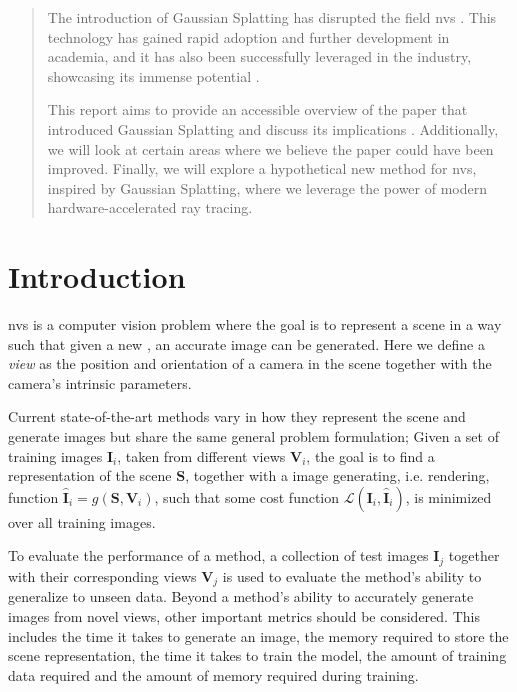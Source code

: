 \begin{abstract}
    The introduction of Gaussian Splatting has disrupted the field \gls{nvs} \cite{kerbl3DGaussianSplatting2023}. This technology has gained rapid adoption and further development in academia, and it has also been successfully leveraged in the industry, showcasing its immense potential \cite{LumaAIVideo}.

    This report aims to provide an accessible overview of the paper that introduced Gaussian Splatting and discuss its implications \cite{kerbl3DGaussianSplatting2023}.
    Additionally, we will look at certain areas where we believe the paper could have been improved.
    Finally, we will explore a hypothetical new method for \gls{nvs}, inspired by Gaussian Splatting, where we leverage the power of modern hardware-accelerated ray tracing.
\end{abstract}

\section{Introduction}
\gls{nvs} is a computer vision problem where the goal is to represent a scene in a way such that given a new , an accurate image can be generated.
Here we define a \textit{view} as the position and orientation of a camera in the scene together with the camera's intrinsic parameters.

Current state-of-the-art methods vary in how they represent the scene and generate images
but share the same general problem formulation;
Given a set of training images $\bm{I}_i$,
taken from different views $\bm{V}_i$,
the goal is to find a representation of the scene $\bm{S}$,
together with a image generating, i.e. rendering, function $\bm{\hat{I}}_i = g(\bm{S}, \bm{V}_i)$,
such that some cost function $\mathcal{L}(\bm{I}_i, \bm{\hat{I}}_i)$,
is minimized over all training images.

To evaluate the performance of a method, a collection of test images $\bm{I}_j$ together with their corresponding views $\bm{V}_j$ is used to evaluate the method's ability to generalize to unseen data.
Beyond a method's ability to accurately generate images from novel views, other important metrics should be considered.
This includes the time it takes to generate an image, the memory required to store the scene representation, the time it takes to train the model, the amount of training data required and the amount of memory required during training.



